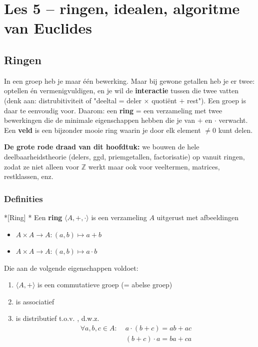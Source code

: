 \section{Les 5 -- ringen, idealen, algoritme van Euclides}

\subsection{Ringen}


In een groep heb je maar één bewerking. Maar bij gewone getallen heb je er twee: optellen én vermenigvuldigen, en je wil de \textbf{interactie} tussen die twee vatten (denk aan: distrubitiviteit of "deeltal = deler $\times$ quotiënt $+$ rest"). Een groep is daar te eenvoudig voor. Daarom: een \textbf{ring} = een verzameling met twee bewerkingen die de minimale eigenschappen hebben die je van $+$ en $\cdot$ verwacht. Een \textbf{veld} is een bijzonder mooie ring waarin je door elk element $\neq 0$ kunt delen.

\begin{barbox}[WildStrawberry][gray!3]
    \textcolor{WildStrawberry}{\textbf{De grote rode draad van dit hoofdtuk:}} we bouwen de hele deelbaarheidstheorie (delers, ggd, priemgetallen, factorisatie) op vanuit ringen, zodat ze niet alleen voor $\mathbb{Z}$ werkt maar ook voor veeltermen, matrices, restklassen, enz.
\end{barbox}

\subsubsection{Definities}

\begin{nicedefinition}*[Ring]
    \nextpart[]*
    Een \textcolor{PineGreen!75!black}{\textbf{ring}} $\langle A, +, \cdot \rangle$ is een verzameling $A$ uitgerust met afbeeldingen
    \begin{itemize}
        \item[] $A \times A \to A : (a,b) \mapsto a+b$
        \item[] $A \times A \to A : (a,b) \mapsto a\cdot b$
    \end{itemize}
    Die aan de volgende eigenschappen voldoet:
    \begin{enumerate}
        \item $\langle A,+ \rangle$ is een commutatieve groep (= abelse groep)
        \item \inlinetext{$\cdot$} is associatief
        \item \inlinetext{$\cdot$} is distributief t.o.v. \inlinetext{+}, d.w.z. 
        \begin{equation*}
            \begin{aligned}
                \forall a,b,c \in A : &\; a\cdot(b+c) = ab +ac \\
                &\;(b+c)\cdot a = ba + ca
            \end{aligned}
        \end{equation*}
    \end{enumerate}
\end{nicedefinition}


